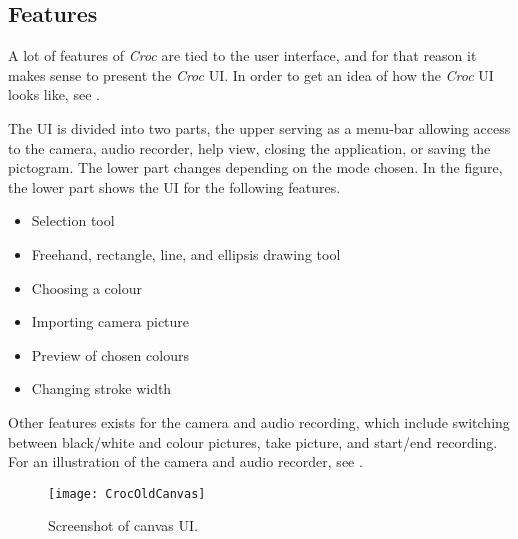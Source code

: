 \subsection{Features}
A lot of features of \textit{Croc} are tied to the user interface, and for that reason it makes sense to present the \textit{Croc} UI.
In order to get an idea of how the \textit{Croc} UI looks like, see . 

The UI is divided into two parts, the upper serving as a menu-bar allowing access to the camera, audio recorder, help view, closing the application, or saving the pictogram.
The lower part changes depending on the mode chosen.
In the figure, the lower part shows the UI for the following features.

\begin{itemize}
     \item Selection tool
     \item Freehand, rectangle, line, and ellipsis drawing tool
     \item Choosing a colour
     \item Importing camera picture
     \item Preview of chosen colours
     \item Changing stroke width
\end{itemize}

Other features exists for the camera and audio recording, which include switching between black/white and colour pictures, take picture, and start/end recording.
For an illustration of the camera and audio recorder, see .

\begin{figure}[h]
     \centering
     \texttt{[image: CrocOldCanvas]}
     \caption{Screenshot of canvas UI.}
     \label{fig:croc-old-canvas}
\end{figure}